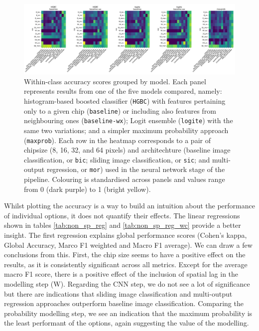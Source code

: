 \documentclass[]{interact}
\theoremstyle{plain}%
\theoremstyle{definition}
\theoremstyle{remark}
\begin{document}
\begin{figure}
    \centering
    \includegraphics[width=1.0\linewidth]{fig/wc_accuracy_x_model.png}
    \caption{Within-class accuracy scores grouped by model. Each panel
    represents results from one of the five models compared, namely:
    histogram-based boosted classifier (\texttt{HGBC}) with features
    pertaining only to a given chip (\texttt{baseline}) or including also features
    from neighbouring ones (\texttt{baseline-wx}); Logit ensemble
    (\texttt{logite}) with the same two variations; and a simpler maximum
    probability approach (\texttt{maxprob}). Each row in the heatmap
    corresponds to a pair of chipsize (8, 16, 32, and 64 pixels)
    and architechture (baseline image classification, or \texttt{bic}; sliding
            image classification, or \texttt{sic}; and multi-output
    regression, or \texttt{mor}) used in the neural network stage of the
    pipeline. Colouring is standardised across panels and values range from
    0 (dark purple) to 1 (bright yellow).}
    \label{fig:wc_accuracy_x_model}
\end{figure}

Whilst plotting the accuracy is a way to build an intuition about the performance of
individual options, it does not quantify their effects. The linear regressions shown in
tables \ref{tab:non_sp_reg} and \ref{tab:non_sp_reg_wc} provide a better insight. The
first regression explains global performance scores (Cohen's kappa, Global Accuracy, Marco F1
weighted and Macro F1 average). We can draw a few conclusions from this. First, the chip size
seems to have a positive effect on the results, as it is consistently
significant across all metrics. Except for the average macro F1 score, there is a
positive effect of the inclusion of spatial lag in the modelling step (W). Regarding the
CNN step, we do not see a lot of significance but there are indications that sliding
image classification and multi-output regression approaches outperform baseline image
classification. Comparing the probability modelling step, we see an indication that the
maximum probability is the least performant of the options, again suggesting the value
of the modelling.
\end{document}
